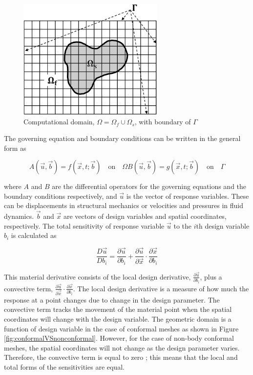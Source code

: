 \documentclass[12pt]{aiaa-pretty}
\begin{document}
%
\begin{figure}[H]
	\centering
	\includegraphics[height=6.0cm]{figure/domain.jpg}
	\caption{Computational domain, $\Omega = \Omega_f \cup \Omega_s$, with boundary of $\Gamma$}
	\label{fig:domain}
\end{figure}
%

The governing equation and boundary conditions can be written in the general form as

%
\begin{subequations}\label{eq:generalFormForGE}
\begin{equation}
	A(\vec{u}, \vec{b}) = f(\vec{x}, t; \vec{b}) \quad \text{on} \quad \Omega
\end{equation}
\begin{equation}
	B(\vec{u}, \vec{b}) = g(\vec{x}, t; \vec{b}) \quad \text{on} \quad \Gamma
\end{equation}
\end{subequations}
%

where $A$ and $B$ are the differential operators for the governing equations and the boundary conditions respectively, and $\vec{u}$ is the vector of response variables. These can be displacements in structural mechanics or velocities and pressures in fluid dynamics. $\vec{b}$ and $\vec{x}$ are vectors of design variables and spatial coordinates, respectively. The total sensitivity of response variable $\vec{u}$ to the $i$th design variable $b_i$ is calculated as

%
\begin{equation}
	\frac{D\vec{u}}{Db_i	} = \frac{\partial \vec{u}}{\partial b_i} + 
	                        \frac{\partial \vec{u}}{\partial \vec{x}} \cdot \frac{\partial \vec{x}}{\partial b_i}
\end{equation}
%

This material derivative consists of the local design derivative, $\frac{\partial \vec{u}}{\partial b_i}$, plus a convective term, $\frac{\partial \vec{u}}{\partial \vec{x}} \cdot \frac{\partial \vec{x}}{\partial b_i}$. The local design derivative is a measure of how much the response at a point changes due to change in the design parameter. The convective term tracks the movement of the material point when the spatial coordinates will change with the design variable. The geometric domain is a function of design variable in the case of conformal meshes as shown in Figure \ref{fig:conformalVSnonconformal}. However, for the case of non-body conformal meshes, the spatial coordinates will not change as the design parameter varies. Therefore, the convective term is equal to zero \cite{gobal2014continuum}; this means that the local and total forms of the sensitivities are equal.
\end{document}
